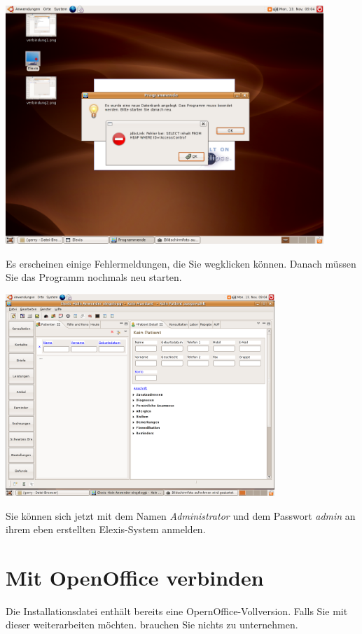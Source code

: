 \includegraphics[width=0.9\textwidth]{images/verbindung13.png}

 Es erscheinen einige Fehlermeldungen, die Sie wegklicken können. Danach müssen Sie das Programm nochmals neu starten.

\includegraphics[width=4in]{images/verbindung14.png}

Sie können sich jetzt mit dem Namen \textit{Administrator} und dem Passwort \textit{admin} an ihrem eben erstellten Elexis-System anmelden.

\section{Mit OpenOffice verbinden}
\label{config:ooo}
Die Installationsdatei enthält bereits eine OpernOffice-Vollversion. Falls Sie mit dieser weiterarbeiten möchten. brauchen Sie nichts zu unternehmen.

